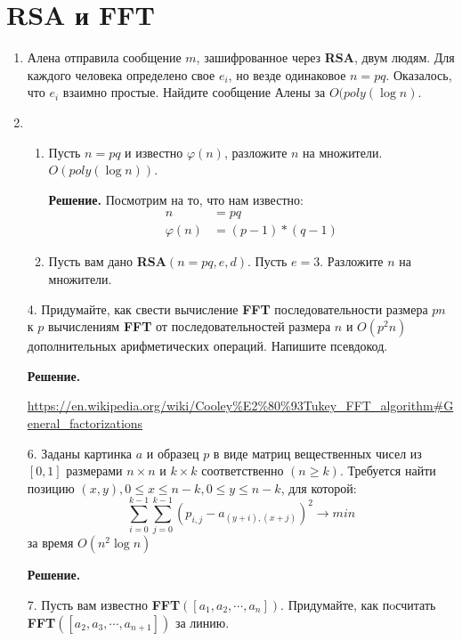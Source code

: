 \section*{RSA и FFT}
\begin{enumerate}
	\item Алена отправила сообщение $m$, зашифрованное через \textbf{RSA}, двум людям. Для каждого человека 
	определено свое $e_i$, но везде одинаковое $n = pq$. Оказалось, что $e_i$ взаимно простые. Найдите сообщение 
	Алены за $O(poly(\log n)$.
	
	\item 
	\begin{enumerate}
		\item Пусть $n = pq$ и известно $\varphi(n)$, разложите $n$ на множители. $O(poly(\log n))$.
		
		\textbf{Решение.} Посмотрим на то, что нам известно:
		\begin{align*}
			n &= pq \\
			\varphi(n) &= (p - 1) * (q - 1)
		\end{align*}
			
		\item Пусть вам дано \textbf{RSA}$(n = pq, e, d)$. Пусть $e = 3$. Разложите $n$ на множители.
	\end{enumerate}
	
	\item[4.] Придумайте, как свести вычисление \textbf{FFT} последовательности размера $pn$ к $p$ вычислениям 
	\textbf{FFT} от	последовательностей размера $n$ и $O(p^2n)$ дополнительных арифметических операций. Напишите 
	псевдокод.
	
	\textbf{Решение.}
	
	\url{https://en.wikipedia.org/wiki/Cooley%E2%80%93Tukey_FFT_algorithm#General_factorizations}
	
	\item[6.] Заданы картинка $a$ и образец $p$ в виде матриц вещественных чисел из $[0, 1]$ размерами $n \times n$ 
	и $k \times k$ соответственно $(n \geqslant k)$. Требуется найти позицию $(x, y), 0 \leqslant x \leqslant n - 
	k, 0 \leqslant y \leqslant n - k$, для которой:
	\begin{equation*}
		\sum\limits_{i = 0}^{k - 1} \sum\limits_{j = 0}^{k - 1} (p_{i,j} - a_{(y + i), (x + j)})^2 \rightarrow min
	\end{equation*}
	за время $O(n^2\log n)$
	
	\textbf{Решение.}
	
	\item[7.] Пусть вам известно \textbf{FFT}$([a_1, a_2, \cdots , a_n])$. Придумайте, как пoсчитать 
	\textbf{FFT}$([a_2, a_3, \cdots , a_{n+1}])$ за линию.	
	
\end{enumerate}



